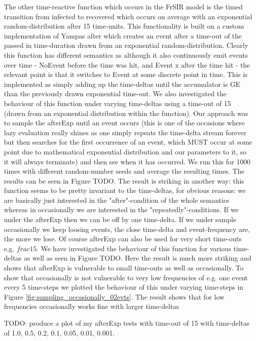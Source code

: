 The other time-reactive function which occurs in the FrSIR model is the timed transition from infected to recovered which occurs on average with an exponential random-distribution after 15 time-units. This functionality is built on a custom implementation of Yampas after which creates an event after a time-out of the passed in time-duration drawn from an exponential random-distribution. Clearly this function has different semantics as although it also continuously emit events over time - NoEvent before the time was hit, and Event x after the time hit - the relevant point is that it switches to Event at some discrete point in time. This is implemented as simply adding up the time-deltas until the accumulator is GE than the previously drawn exponential time-out. We also investigated the behaviour of this function under varying time-deltas using a time-out of 15 (drawn from an exponential distribution within the function). Our approach was to sample the afterExp until an event occurs (this is one of the occasions where lazy evaluation really shines as one simply repeats the time-delta stream forever but then searches for the first occurrence of an event, which MUST occur at some point due to mathematical exponential distribution and our parameters to it, so it will always terminate) and then see when it has occurred. We run this for 1000 times with different random-number seeds and average the resulting times. The results can be seen in Figure TODO. The result is striking in another way: this function seems to be pretty invariant to the time-deltas, for obvious reasons: we are basically just interested in the "after"-condition of the whole semantics whereas in occasionally we are interested in the "repeatedly"-conditions. If we under the afterExp then we can be off by one time-delta. If we under sample occasionally we keep loosing events, the close time-delta and event-frequency are, the more we lose. Of course afterExp can also be used for very short time-outs e.g. $frac{1}{5}$. We have investigated the behaviour of this function for various time-deltas as well as seen in Figure TODO. Here the result is much more striking and shows that afterExp is vulnerable to small time-outs as well as occasionally. 
To show that occasionally is not vulnerable to very low frequencies of e.g. one event every 5 time-steps we plotted the behaviour of this under varying time-steps in Figure \ref{fig:sampling_occasionally_02evts}. The result shows that for low frequencies occasionally works fine with larger time-deltas

TODO: produce a plot of my afterExp tests with time-out of 15 with time-deltas of 1.0, 0.5, 0.2, 0.1, 0.05, 0.01, 0.001.

